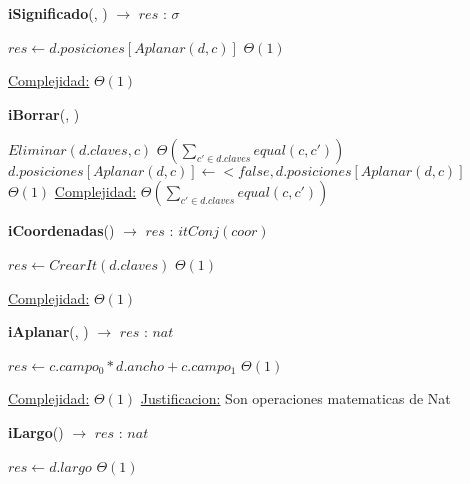 \begin{Algoritmos}
\begin{algorithm}[H]{\textbf{iSignificado}(, ) $\to$ $res$ : $\sigma$}
    	\begin{algorithmic}[1]
            \State $res \gets d.posiciones[Aplanar(d, c)]$ \Comment $\Theta(1)$
			
			\medskip
			\Statex \underline{Complejidad:} $\Theta(1)$
        \end{algorithmic}
\end{algorithm}

\begin{algorithm}[H]{\textbf{iBorrar}(, )}
    	\begin{algorithmic}[1]
            \State $Eliminar(d.claves, c)$ \Comment $\Theta\left(\displaystyle\sum_{c' \in d.claves}equal(c,c')\right)$
            \State $d.posiciones[Aplanar(d, c)] \gets <false, d.posiciones[Aplanar(d, c)]$ \Comment $\Theta(1)$
			\medskip
			\Statex \underline{Complejidad:} $\Theta\left(\displaystyle\sum_{c' \in d.claves}equal(c,c')\right)$
        \end{algorithmic}
\end{algorithm}

\begin{algorithm}[H]{\textbf{iCoordenadas}() $\to$ $res$ : $itConj(coor)$}
    	\begin{algorithmic}[1]
            \State $res \gets CrearIt(d.claves)$ \Comment $\Theta(1)$

			\medskip
			\Statex \underline{Complejidad:} $\Theta(1)$
        \end{algorithmic}
\end{algorithm}

\begin{algorithm}[H]{\textbf{iAplanar}(, ) $\to$ $res$ : $nat$}
    	\begin{algorithmic}[1]
			\State $res \gets c.campo_0 * d.ancho + c.campo_1 $ \Comment $\Theta(1)$
			
			\medskip
			\Statex \underline{Complejidad:} $\Theta(1)$
            \Statex \underline{Justificacion:} Son operaciones matematicas de Nat
        \end{algorithmic}
\end{algorithm}

\begin{algorithm}[H]{\textbf{iLargo}() $\to$ $res$ : $nat$}
    	\begin{algorithmic}[1]
            \State $res \gets d.largo$ \Comment $\Theta(1)$


\end{algorithmic}
\end{algorithm}
\end{Algoritmos}
